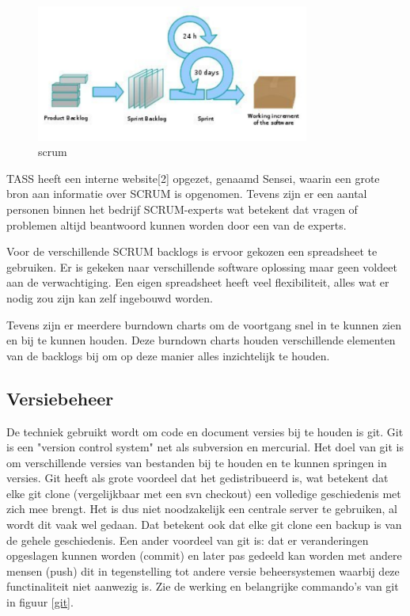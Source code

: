 \documentclass[]{article}
\begin{document}
\begin{figure}[htpb]
  \begin{center}
    \includegraphics[width=0.80\textwidth]{scrum.pdf}
  \end{center}
  \caption{scrum}
\end{figure}

TASS heeft een interne website[2] opgezet, genaamd Sensei, waarin
een grote bron aan informatie over SCRUM is opgenomen. Tevens zijn er een
aantal personen binnen het bedrijf SCRUM-experts wat betekent dat vragen of
problemen altijd beantwoord kunnen worden door een van de experts.

Voor de verschillende SCRUM backlogs is ervoor gekozen een spreadsheet te
gebruiken. Er is gekeken naar verschillende software oplossing maar geen
voldeet aan de verwachtiging. Een eigen spreadsheet heeft veel
flexibiliteit, alles wat er nodig zou zijn kan zelf ingebouwd worden.

Tevens zijn er meerdere burndown charts om de voortgang snel in te kunnen
zien en bij te kunnen houden. Deze burndown charts houden verschillende
elementen van de backlogs bij om op deze manier alles inzichtelijk te
houden.

\newpage
\subsection{Versiebeheer}

De techniek gebruikt wordt om code en document versies bij te houden is
git. Git is een "version control system" net als subversion en
mercurial. Het doel van git is om verschillende versies van bestanden bij
te houden en te kunnen springen in versies. Git heeft als grote voordeel
dat het gedistribueerd is, wat betekent dat elke git clone (vergelijkbaar
met een svn checkout) een volledige geschiedenis met zich mee brengt. Het is
dus niet noodzakelijk een centrale server te gebruiken, al wordt dit vaak
wel gedaan. Dat betekent ook dat elke git clone een backup is van de gehele
geschiedenis. Een ander voordeel van git is: dat er veranderingen opgeslagen
kunnen worden (commit) en later pas gedeeld kan worden met andere mensen (push) dit in
tegenstelling tot andere versie beheersystemen waarbij deze functinaliteit niet
aanwezig is. Zie de werking en belangrijke commando's van git in figuur \ref{git}.
\end{document}
